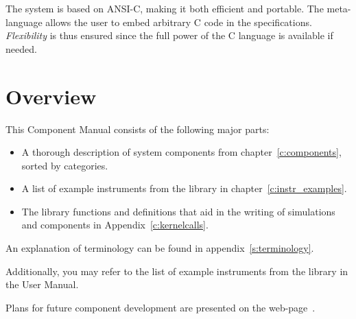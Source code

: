 The \MCS system is based on ANSI-C, making it both efficient and
portable. The meta-language allows the user to embed arbitrary C code in
the specifications. \textit{Flexibility} is thus ensured since the full
power of the C language is available if needed.


\section{Overview}

This \MCS Component Manual consists of the following major parts:
\begin{itemize}
\item A thorough description of system components 
from chapter~\ref{c:components}, sorted by categories. 
\item A list of example instruments from the library in chapter~\ref{c:instr_examples}. 
\item The \MCS library functions and definitions
  that aid in the writing of simulations and components in
  Appendix~\ref{c:kernelcalls}.    
\end{itemize}
An explanation of \MCS terminology can be
found in appendix~\ref{s:terminology}.

Additionally, you may refer to the list of example instruments from the library in the \MCS User Manual.

Plans for future component development are presented 
on the \MCS web-page~\cite{mcstas_webpage}.




